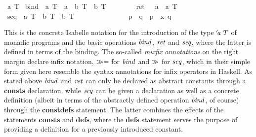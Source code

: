 \begin{isabellebody}
\isanewline
\isamarkuptrue%
\ {\isacharprime}a\ T\isanewline
\isanewline
\isamarkupfalse%
\isamarkuptrue%
\isanewline
\ bind\ {\isacharcolon}{\isacharcolon}\ {\isachardoublequote}{\isacharprime}a\ T\ {\isasymRightarrow}\ {\isacharparenleft}{\isacharprime}a\ {\isasymRightarrow}\ {\isacharprime}b\ T{\isacharparenright}\ {\isasymRightarrow}\ {\isacharprime}b\ T{\isachardoublequote}\ \ \ \ \ {\isacharparenleft}\ {\isachardoublequote}{\isasymggreater}{\isacharequal}{\isachardoublequote}\ {}{}{\isacharparenright}\isanewline
\ ret\ \ {\isacharcolon}{\isacharcolon}\ {\isachardoublequote}{\isacharprime}a\ {\isasymRightarrow}\ {\isacharprime}a\ T{\isachardoublequote}\isanewline
\isanewline
\isamarkupfalse%
\isanewline
\ seq\ {\isacharcolon}{\isacharcolon}\ {\isachardoublequote}{\isacharprime}a\ T\ {\isasymRightarrow}\ {\isacharprime}b\ T\ {\isasymRightarrow}\ {\isacharprime}b\ T{\isachardoublequote}\ \ \ \ \ \ \ \ \ \ \ \ {\isacharparenleft}\ {\isachardoublequote}{\isasymggreater}{\isachardoublequote}\ {}{}{\isacharparenright}\isanewline
\ {\isachardoublequote}p\ {\isasymggreater}\ q\ {\isasymequiv}\ {\isacharparenleft}p\ {\isasymggreater}{\isacharequal}\ {\isacharparenleft}{\isasymlambda}x{\isachardot}\ q{\isacharparenright}{\isacharparenright}{\isachardoublequote}\isamarkupfalse%
\isanewline%
\end{isabellebody}
This is the concrete Isabelle notation for the introduction of the type
${'\!\mathit{a}}\ T$ of monadic programs and the basic operations $\mathit{bind}$, $\mathit{ret}$
and $\mathit{seq}$, where the latter is defined in terms of the binding. The
so-called \emph{mixfix annotations} on the right margin declare infix notation,
$\gg=$ for $\mathit{bind}$ and $\gg$ for $\mathit{seq}$, which in their simple
form given here resemble the syntax annotations for infix operators in Haskell.
As stated above $\mathit{bind}$ and $\mathit{ret}$ can only be declared as abstract
constants through a \textbf{consts} declaration, while $\mathit{seq}$ can be given a
declaration as well as a concrete definition (albeit in terms of the abstractly
defined operation $\mathit{bind}$, of course) through the \textbf{constdefs}
statement. The latter combines the effects of the statements \textbf{consts} and
\textbf{defs}, where the \textbf{defs} statement serves the purpose of providing
a definition for a previously introduced constant.

